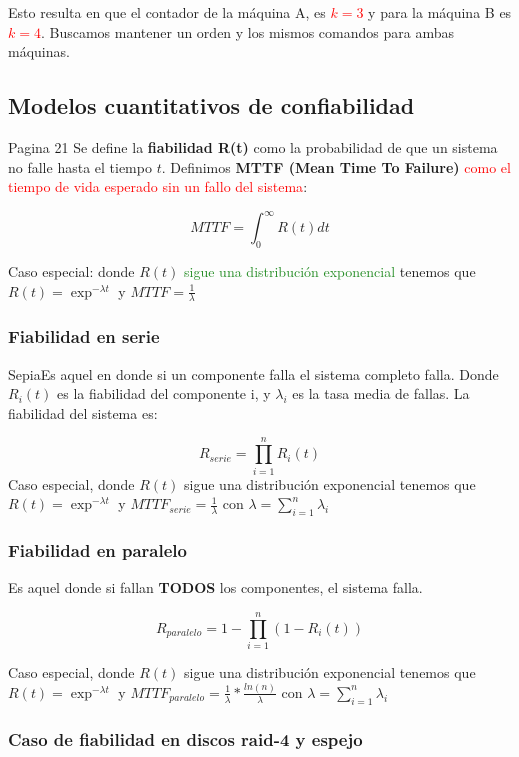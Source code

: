 Esto resulta en que el contador de la máquina A, es \textcolor{red}{$k=3$} y para la máquina B es \textcolor{red}{$k=4$}. Buscamos mantener un orden y los mismos comandos para ambas máquinas.

\subsection{Modelos cuantitativos de confiabilidad}
Pagina 21
Se define la \textbf{fiabilidad R(t)} \textcolor{Sepia}{como la probabilidad de que un sistema no falle hasta el tiempo $t$}. Definimos \textbf{MTTF (Mean Time To Failure)} \textcolor{red}{como el tiempo de vida esperado sin un fallo del sistema}:

\[
  \textstyle  MTTF= \int_{0}^{\infty}R(t)dt
\]

Caso especial: donde $R(t)$ \textcolor{ForestGreen}{sigue una distribución exponencial} tenemos que $R(t)=\exp^{-\lambda t}$ y $MTTF= \frac{1}{\lambda}$

\subsubsection{Fiabilidad en serie}
{Sepia}{Es aquel en donde si un componente falla el sistema completo falla}. Donde $R_i(t)$ es la fiabilidad del componente i, y $\lambda_i$ es la tasa media de fallas. La fiabilidad del sistema es:

\[
  \textstyle  R_{serie}=\prod_{i=1}^{n} R_i(t)
\]
Caso especial, donde $R(t)$ \textcolor{Sepia}{sigue una distribución exponencia}l tenemos que $R(t)=\exp^{-\lambda t}$ y $MTTF_{serie}= \frac{1}{\lambda}$ con $\lambda= \sum_{i=1}^{n}\lambda_i $ 

\subsubsection{Fiabilidad en paralelo}
Es aquel donde \textcolor{Sepia}{si fallan \textbf{TODOS} los componentes, el sistema falla}.

\[
  \textstyle  R_{paralelo}= 1 - \prod_{i=1}^{n} (1-R_i(t))
\]

Caso especial, donde $R(t)$ sigue una distribución exponencial tenemos que $R(t)=\exp^{-\lambda t}$ y $MTTF_{paralelo}= \frac{1}{\lambda}*\frac{ln(n)}{\lambda}$ con $\lambda= \sum_{i=1}^{n}\lambda_i $

\subsubsection{Caso de fiabilidad en discos raid-4 y espejo}

